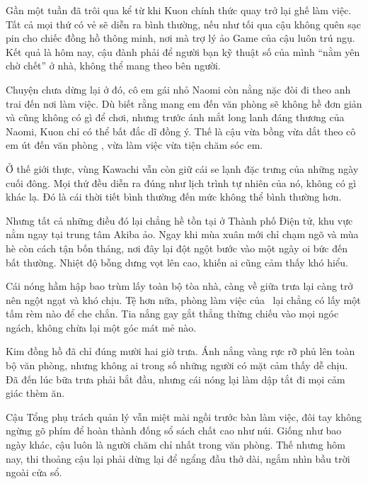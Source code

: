 \documentclass[../main.tex]{subfiles}
\begin{document}

Gần một tuần đã trôi qua kể từ khi Kuon chính thức quay trở lại ghế làm việc. Tất cả mọi thứ có vẻ sẽ diễn ra bình thường, nếu như tối qua cậu không quên sạc pin cho chiếc đồng hồ thông minh, nơi mà trợ lý ảo Game của cậu luôn trú ngụ. Kết quả là hôm nay, cậu đành phải để người bạn kỹ thuật số của mình ``nằm yên chờ chết'' ở nhà, không thể mang theo bên người.

Chuyện chưa dừng lại ở đó, cô em gái nhỏ Naomi còn nằng nặc đòi đi theo anh trai đến nơi làm việc. Dù biết rằng mang em đến văn phòng sẽ không hề đơn giản và cũng không có gì để chơi, nhưng trước ánh mắt long lanh đáng thương của Naomi, Kuon chỉ có thể bất đắc dĩ đồng ý. Thế là cậu vừa bồng vừa dắt theo cô em út đến văn phòng \hll, vừa làm việc vừa tiện chăm sóc em.

Ở thế giới thực, vùng Kawachi vẫn còn giữ cái se lạnh đặc trưng của những ngày cuối đông. Mọi thứ đều diễn ra đúng như lịch trình tự nhiên của nó, không có gì khác lạ. Đó là cái thời tiết bình thường đến mức không thể bình thường hơn.

Nhưng tất cả những điều đó lại chẳng hề tồn tại ở Thành phố Điện tử, khu vực nằm ngay tại trung tâm Akiba ảo. Ngay khi mùa xuân mới chỉ chạm ngõ và mùa hè còn cách tận bốn tháng, nơi đây lại đột ngột bước vào một ngày oi bức đến bất thường. Nhiệt độ bỗng dưng vọt lên cao, khiến ai cũng cảm thấy khó hiểu.

Cái nóng hầm hập bao trùm lấy toàn bộ tòa nhà, càng về giữa trưa lại càng trở nên ngột ngạt và khó chịu. Tệ hơn nữa, phòng làm việc của \hll\ lại chẳng có lấy một tấm rèm nào để che chắn. Tia nắng gay gắt thẳng thừng chiếu vào mọi ngóc ngách, không chừa lại một góc mát mẻ nào.

Kim đồng hồ đã chỉ đúng mười hai giờ trưa. Ánh nắng vàng rực rỡ phủ lên toàn bộ văn phòng, nhưng không ai trong số những người có mặt cảm thấy dễ chịu. Đã đến lúc bữa trưa phải bắt đầu, nhưng cái nóng lại làm dập tắt đi mọi cảm giác thèm ăn.

Cậu Tổng phụ trách quản lý vẫn miệt mài ngồi trước bàn làm việc, đôi tay không ngừng gõ phím để hoàn thành đống sổ sách chất cao như núi. Giống như bao ngày khác, cậu luôn là người chăm chỉ nhất trong văn phòng. Thế nhưng hôm nay, thi thoảng cậu lại phải dừng lại để ngẩng đầu thở dài, ngắm nhìn bầu trời ngoài cửa sổ.
\end{document}
